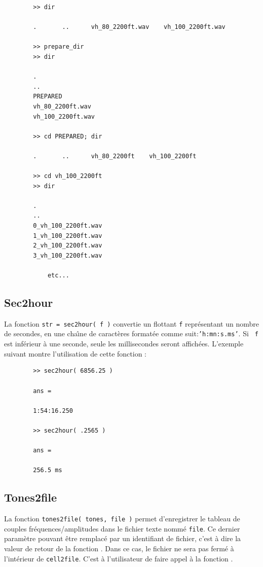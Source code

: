     \begin{verbatim}
        >> dir

        .       ..      vh_80_2200ft.wav    vh_100_2200ft.wav

        >> prepare_dir
        >> dir

        .
        ..
        PREPARED
        vh_80_2200ft.wav
        vh_100_2200ft.wav

        >> cd PREPARED; dir

        .       ..      vh_80_2200ft    vh_100_2200ft

        >> cd vh_100_2200ft
        >> dir

        .
        ..
        0_vh_100_2200ft.wav
        1_vh_100_2200ft.wav
        2_vh_100_2200ft.wav
        3_vh_100_2200ft.wav

            etc...
    \end{verbatim}


    \bigskip
    \subsection{Sec2hour}
    \label{sec2hour}
    La fonction {\tt str = sec2hour( f )} convertie un flottant
    {\tt f} repr{\'e}sentant un nombre de secondes, en une cha{\^\i}ne de
    caract{\`e}res format{\'e}e comme suit:{\tt 'h:mn:s.ms'}. Si {\tt
    f} est inf{\'e}rieur {\`a} une seconde, seule les millisecondes seront
    affich{\'e}es. L'exemple suivant montre l'utilisation de cette
    fonction :

    \begin{verbatim}
        >> sec2hour( 6856.25 )

        ans =

        1:54:16.250

        >> sec2hour( .2565 )

        ans =

        256.5 ms
    \end{verbatim}


    \bigskip
    \subsection{Tones2file}
    \label{tones2file}
    La fonction {\tt tones2file( tones, file )} permet
    d'enregistrer le tableau de couples fr{\'e}quences/amplitudes dans
    le fichier texte nomm{\'e} {\tt file}. Ce dernier param{\`e}tre pouvant
    {\^e}tre remplac{\'e} par un identifiant de fichier, c'est {\`a} dire la valeur
    de retour de la fonction . Dans ce cas,
    le fichier ne sera pas ferm{\'e} {\`a} l'int{\'e}rieur de {\tt cell2file}.
    C'est {\`a} l'utilisateur de faire appel {\`a} la fonction .


